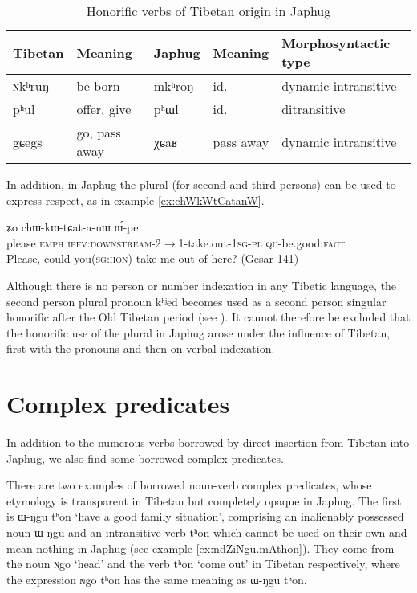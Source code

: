 \documentclass[oldfontcommands,oneside,a4paper,11pt]{article}
\newcommand{\ipa}[1]{{\phon \mbox{#1}}} %
\begin{document}
\begin{table}
\caption{Honorific verbs of Tibetan origin in Japhug} \centering \label{tab:hon}
\begin{tabular}{lllll}
\toprule
Tibetan & Meaning & Japhug &Meaning &Morphosyntactic type \\
\midrule
\ipa{ɴkʰruŋ} & be born & \ipa{mkʰroŋ} &id. &dynamic intransitive \\
\ipa{pʰul} & offer, give  & \ipa{pʰɯl} &id. &ditransitive \\
\ipa{gɕegs} & go, pass away & \ipa{χɕaʁ} &pass away &dynamic intransitive \\
\bottomrule
\end{tabular}
\end{table}

In addition, in Japhug the plural (for second and third persons) can be used to express respect, as in example \ref{ex:chWkWtCatanW}. 

\begin{exe}
\ex \label{ex:chWkWtCatanW}
\gll \ipa{wortɕhiwojɤr}  	\ipa{ʑo}  	\ipa{chɯ-kɯ-tɕat-a-nɯ}  	\ipa{ɯ́-pe}  \\
please \textsc{emph} \textsc{ipfv:downstream}-2$\rightarrow$1-take.out-\textsc{1sg-pl} \textsc{qu}-be.good:\textsc{fact} \\
\glt Please, could you(\textsc{sg:hon}) take me out of here? (Gesar 141)
\end{exe}

Although there is no person or number indexation in any Tibetic language, the second person plural pronoun \ipa{kʰʲed} becomes used as a second person singular honorific after the Old Tibetan period (see \citealt[563-4]{hill10pronouns}). It cannot therefore be excluded that the honorific use of the plural in Japhug arose under the influence of Tibetan, first with the pronouns and then on verbal indexation.

  \section{Complex predicates}  
In addition to the numerous verbs borrowed by direct insertion from Tibetan into Japhug, we also find some borrowed complex predicates.

There are two examples of borrowed noun-verb complex predicates, whose etymology is transparent in Tibetan but completely opaque in Japhug. The first is \ipa{ɯ-ŋgu} \ipa{tʰon} `have a good family situation', comprising an inalienably possessed noun \ipa{ɯ-ŋgu} and an intransitive verb \ipa{tʰon} which cannot be used on their own and mean nothing in Japhug (see example \ref{ex:ndZiNgu.mAthon}). They come from the noun \ipa{ɴgo} `head' and the verb \ipa{tʰon} `come out' in Tibetan respectively, where the expression \ipa{ɴgo} \ipa{tʰon} has the same meaning as \ipa{ɯ-ŋgu} \ipa{tʰon}.
\end{document}
